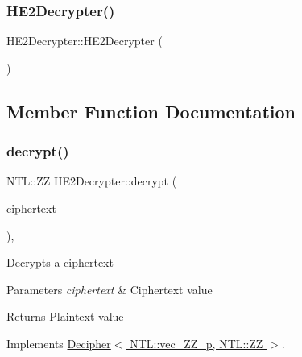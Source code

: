 \subsubsection{\texorpdfstring{H\+E2\+Decrypter()}{HE2Decrypter()}}
{\footnotesize\ttfamily H\+E2\+Decrypter\+::\+H\+E2\+Decrypter (\begin{DoxyParamCaption}{ }\end{DoxyParamCaption})\hspace{0.3cm}{\ttfamily [inline]}}



\subsection{Member Function Documentation}
\mbox{\label{classHE2Decrypter_a766f96cb2277fd3e4af59ca44a32d519}} 
\subsubsection{\texorpdfstring{decrypt()}{decrypt()}}
{\footnotesize\ttfamily N\+T\+L\+::\+ZZ H\+E2\+Decrypter\+::decrypt (\begin{DoxyParamCaption}\item[{N\+T\+L\+::vec\+\_\+\+Z\+Z\+\_\+p \&}]{ciphertext }\end{DoxyParamCaption})\hspace{0.3cm}{\ttfamily [override]}, {\ttfamily [virtual]}}

Decrypts a ciphertext 
\begin{DoxyParams}{Parameters}
{\em ciphertext} & Ciphertext value \\
\hline
\end{DoxyParams}
\begin{DoxyReturn}{Returns}
Plaintext value 
\end{DoxyReturn}


Implements \hyperlink{classDecipher_ac6b8c369eda2d7e17fa90cb594cf41b6}{Decipher$<$ N\+T\+L\+::vec\+\_\+\+Z\+Z\+\_\+p, N\+T\+L\+::\+Z\+Z $>$}.

\mbox{\label{classHE2Decrypter_a9cf1a6eae2667f6e891237589c4eeda0}} 
